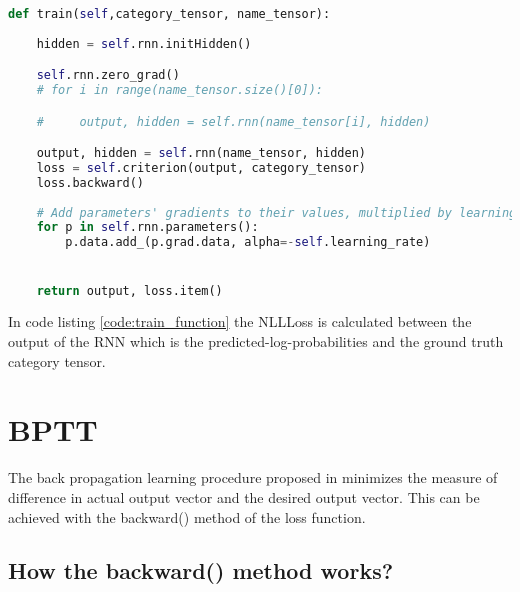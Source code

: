 \begin{lstlisting}[language=Python,caption={Train function},label={code:train_function}]
    
def train(self,category_tensor, name_tensor):
    
    hidden = self.rnn.initHidden()

    self.rnn.zero_grad()
    # for i in range(name_tensor.size()[0]):     

    #     output, hidden = self.rnn(name_tensor[i], hidden)

    output, hidden = self.rnn(name_tensor, hidden)
    loss = self.criterion(output, category_tensor)
    loss.backward()
   
    # Add parameters' gradients to their values, multiplied by learning rate
    for p in self.rnn.parameters():
        p.data.add_(p.grad.data, alpha=-self.learning_rate)


    return output, loss.item()
\end{lstlisting}

In code listing \ref{code:train_function} the \acl{NLLLoss} is calculated between the output of the RNN which is the predicted-log-probabilities and the ground truth category tensor.

\section{\acf{BPTT}}

The back propagation learning procedure proposed in  \parencite{Rumelhart.1986} minimizes the measure of difference in actual output vector and the desired output vector. This can be achieved with the backward() method of the loss function.

\subsection{How the backward() method works?} \label{sec:backward}

